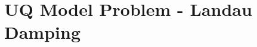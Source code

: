 \documentclass{article}
\begin{document}
\vspace{0.01cm}

%
%
%
%


\section{UQ Model Problem - Landau Damping}
\end{document}
